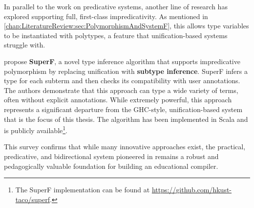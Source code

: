 In parallel to the work on predicative systems, another line of research has explored supporting full, first-class impredicativity. As mentioned in \cref{chap:LiteratureReview:sec:PolymorphismAndSystemF}, this allows type variables to be instantiated with polytypes, a feature that unification-based systems struggle with.

\citeauthor{parreaux-when-2024} \cite{parreaux-when-2024} propose \textbf{SuperF}, a novel type inference algorithm that supports impredicative polymorphism by replacing unification with \textbf{subtype inference}. SuperF infers a type for each subterm and then checks its compatibility with user annotations. The authors demonstrate that this approach can type a wide variety of terms, often without explicit annotations. While extremely powerful, this approach represents a significant departure from the GHC-style, unification-based system that is the focus of this thesis. The algorithm has been implemented in Scala and is publicly available\footnote{The SuperF implementation can be found at \url{https://github.com/hkust-taco/superf}.}.

This survey confirms that while many innovative approaches exist, the practical, predicative, and bidirectional system pioneered in \cite{jones-practical-2007} remains a robust and pedagogically valuable foundation for building an educational compiler.